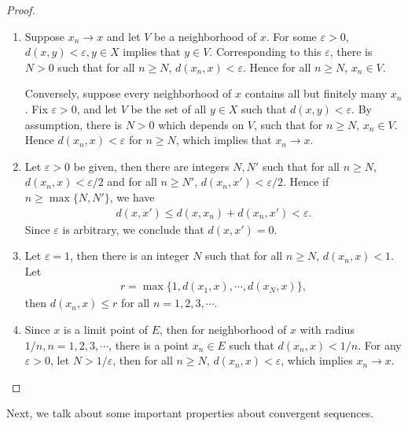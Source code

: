\documentclass[11pt]{book}
\theoremstyle{definition}
\numberwithin{equation}{chapter}
\begin{document}
\begin{proof}
~\begin{enumerate}[label=(\alph*)]
    \item Suppose $x_n \to x$ and let $V$ be a neighborhood of $x$. For some $\varepsilon > 0$, $d(x,y) < \varepsilon, y \in X$ implies that $y \in V$. Corresponding to this $\varepsilon$, there is $N > 0$ such that for all $n \geq N$, $d(x_n,x) < \varepsilon$. Hence for all $n \geq N$, $x_n \in V$.
    
    Conversely, suppose every neighborhood of $x$ contains all but finitely many $x_n$. Fix $\varepsilon > 0$, and let $V$ be the set of all $y \in X$ such that $d(x,y) < \varepsilon$. By assumption, there is $N > 0$ which depends on $V$, such that for $n \geq N$, $x_n \in V$. Hence $d(x_n, x) < \varepsilon$ for $n \geq N$, which implies that $x_n \to x$.
    
    \item Let $\varepsilon > 0$ be given, then there are integers $N, N'$ such that for all $n \geq N$, $d(x_n,x) < \varepsilon/2$ and for all $n \geq N'$, $d(x_n,x') < \varepsilon/2$. Hence if $n \geq \max \{N, N'\}$, we have
    \begin{align*}
        d(x,x') \leq d(x,x_n) + d(x_n,x') < \varepsilon.
    \end{align*}
    Since $\varepsilon$ is arbitrary, we conclude that $d(x,x') = 0$.
    
    \item Let $\varepsilon = 1$, then there is an integer $N$ such that for all $n \geq N$, $d(x_n, x) < 1$. Let \begin{align*}
        r = \max\{1, d(x_1,x), \cdots, d(x_N,x)\},
    \end{align*}
    then $d(x_n,x) \leq r$ for all $n = 1,2,3,\cdots$.
    
    \item Since $x$ is a limit point of $E$, then for neighborhood of $x$ with radius $1/n, n = 1,2,3,\cdots$, there is a point $x_n \in E$ such that $d(x_n,x) < 1/n$. For any $\varepsilon > 0$, let $N > 1/\varepsilon$, then for all $n \geq N$, $d(x_n, x) < \varepsilon$, which implies $x_n \to x$.
\end{enumerate}
\end{proof}

\medskip

Next, we talk about some important properties about convergent sequences.

\medskip
\end{document}
